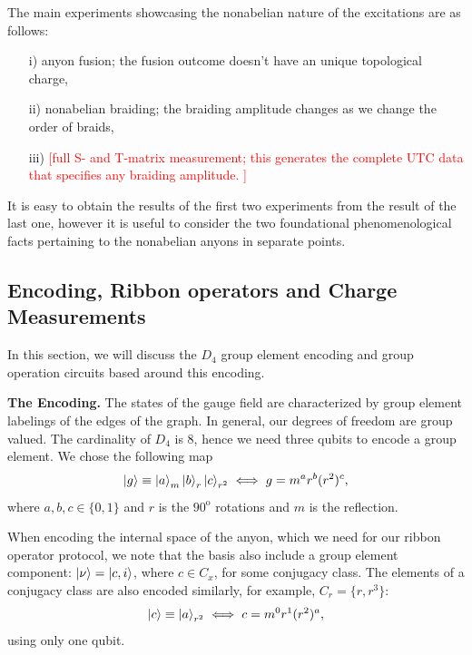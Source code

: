 \documentclass[two column]{article}
\newcommand{\caro}[1]{\textcolor{red}{[#1]}}
\begin{document}
The main experiments showcasing the nonabelian nature of the excitations are as follows:\begin{itemize}

\item[i)] anyon fusion; the fusion outcome doesn't have an unique topological charge,

\item[ii)] nonabelian braiding; the braiding amplitude changes as we change the order of braids,

\item[iii)] \caro{full S- and T-matrix measurement; this generates the complete UTC data that specifies any braiding amplitude.
} 
\end{itemize}

It is easy to obtain the results of the first two experiments from the result of the last one, however it is useful to consider the two foundational phenomenological facts pertaining to the nonabelian anyons in separate points.

\subsection{Encoding, Ribbon operators and Charge Measurements}\label{subsec:enc}

In this section, we will discuss the $D_4$ group element encoding and group operation circuits based around this encoding.

\textbf{The Encoding.} The states of the gauge field are characterized by group element labelings of the edges of the graph.
In general, our degrees of freedom are group valued.
The cardinality of $D_4$ is 8, hence we need three qubits to encode a group element.
We chose the following map
\begin{equation}
    \ket{g} \equiv \ket{a}_m\ket{b}_r\ket{c}_{r^2} \iff g = m^a r^b (r^2)^c,
\end{equation}
where $a,b,c \in \{0,1\}$ and $r$ is the $90^{\text{o}}$ rotations and $m$ is the reflection.

When encoding the internal space of the anyon, which we need for our ribbon operator protocol, we note that the basis also include a group element component: $\ket{\nu} = \ket{c, i}$, where $c \in C_x$, for some conjugacy class.
The elements of a conjugacy class are also encoded similarly, for example, $C_r = \{r, r^3\}$:
\begin{equation}
    \ket{c} \equiv \ket{a}_{r^2} \iff c = m^0r^1(r^2)^a,
\end{equation}
using only one qubit.
\end{document}
